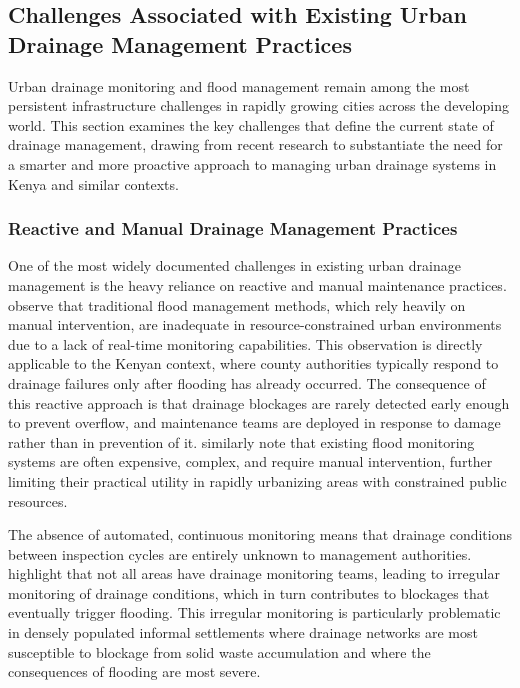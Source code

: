 \documentclass[12pt, a4paper]{article}
\begin{document}
\subsection{Challenges Associated with Existing Urban Drainage Management Practices}

Urban drainage monitoring and flood management remain among the most persistent infrastructure challenges in rapidly growing cities across the developing world. This section examines the key challenges that define the current state of drainage management, drawing from recent research to substantiate the need for a smarter and more proactive approach to managing urban drainage systems in Kenya and similar contexts.

\subsubsection{Reactive and Manual Drainage Management Practices}

One of the most widely documented challenges in existing urban drainage management is the heavy reliance on reactive and manual maintenance practices. \citet{nageye2025} observe that traditional flood management methods, which rely heavily on manual intervention, are inadequate in resource-constrained urban environments due to a lack of real-time monitoring capabilities. This observation is directly applicable to the Kenyan context, where county authorities typically respond to drainage failures only after flooding has already occurred. The consequence of this reactive approach is that drainage blockages are rarely detected early enough to prevent overflow, and maintenance teams are deployed in response to damage rather than in prevention of it. \citet{kumar2025} similarly note that existing flood monitoring systems are often expensive, complex, and require manual intervention, further limiting their practical utility in rapidly urbanizing areas with constrained public resources.

The absence of automated, continuous monitoring means that drainage conditions between inspection cycles are entirely unknown to management authorities. \citet{sonawane2018} highlight that not all areas have drainage monitoring teams, leading to irregular monitoring of drainage conditions, which in turn contributes to blockages that eventually trigger flooding. This irregular monitoring is particularly problematic in densely populated informal settlements where drainage networks are most susceptible to blockage from solid waste accumulation and where the consequences of flooding are most severe.
\end{document}
